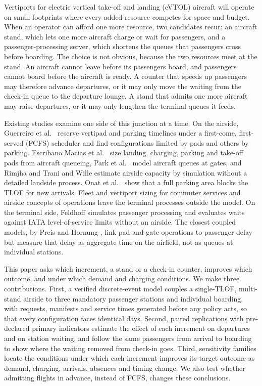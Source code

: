 \documentclass[12pt,a4paper]{article}
\begin{document}
Vertiports for electric vertical take-off and landing (eVTOL) aircraft will operate on small
footprints where every added resource competes for space and budget. When an operator can afford
one more resource, two candidates recur: an aircraft stand, which lets one more aircraft charge or
wait for passengers, and a passenger-processing server, which shortens the queues that passengers
cross before boarding. The choice is not obvious, because the two resources meet at the stand. An
aircraft cannot leave before its passengers board, and passengers cannot board before the aircraft
is ready. A counter that speeds up passengers may therefore advance departures, or it may only move
the waiting from the check-in queue to the departure lounge. A stand that admits one more aircraft
may raise departures, or it may only lengthen the terminal queues it feeds.

Existing studies examine one side of this junction at a time. On the airside, Guerreiro et al.\
\cite{guerreiro2020} reserve vertipad and parking timelines under a first-come, first-served
(FCFS) scheduler and find configurations limited by pads and others by parking. Escribano Macias et
al.\ \cite{escribanoMacias2023} size landing, charging, parking and take-off pads from aircraft
queueing, Park et al.\ \cite{park2022} model aircraft queues at gates, and Rimjha and Trani
\cite{rimjhaTrani2021} and Wille \cite{wille2026} estimate airside capacity by simulation without a
detailed landside process. Onat et al.\ \cite{onat2026buffer} show that a full parking area blocks
the TLOF for new arrivals. Fleet and vertiport sizing for commuter services
\cite{kotwicz2024} and airside concepts of operations \cite{schweigerKnabeKorn2022} leave the
terminal processes outside the model. On the terminal side, Feldhoff \cite{feldhoff2022} simulates
passenger processing and evaluates waits against IATA level-of-service limits without an airside.
The closest coupled models, by Preis and Hornung \cite{preisHornung2022,preisHornung2022heuristic},
link pad and gate operations to passenger delay but measure that delay as aggregate time on the
airfield, not as queues at individual stations.

This paper asks which increment, a stand or a check-in counter, improves which outcome, and under
which demand and charging conditions. We make three contributions. First, a verified
discrete-event model couples a single-TLOF, multi-stand airside to three mandatory passenger
stations and individual boarding, with requests, manifests and service times generated before any
policy acts, so that every configuration faces identical days. Second, paired replications with
pre-declared primary indicators estimate the effect of each increment on departures and on station
waiting, and follow the same passengers from arrival to boarding to show where the waiting removed
from check-in goes. Third, sensitivity families locate the conditions under which each increment
improves its target outcome as demand, charging, arrivals, absences and timing change. We also test whether
admitting flights in advance, instead of FCFS, changes these conclusions.
\end{document}
